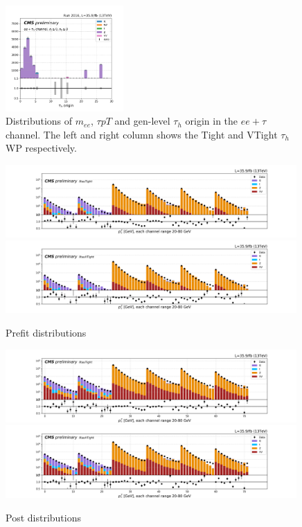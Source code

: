 \begin{figure}
    \includegraphics[width=0.4\textwidth]{appendices/jetToTauhReweighting/figures/eetau_tauGenFlavor_pickles_lltauVTight.png}
    \caption{Distributions of $m_{ee}$, $\tau pT$ and gen-level $\tau_h$ origin in the $ee+\tau$ channel. The left and right column shows the Tight and VTight $\tau_h$ WP respectively.}
    \label{fig:appendix:fakeTauId:eetau}
\end{figure}


\begin{figure}
    \centering
    \includegraphics[width=0.99\textwidth]{appendices/jetToTauhReweighting/figures/2020_tauID_prefit_lltauTight.png}
    \includegraphics[width=0.99\textwidth]{appendices/jetToTauhReweighting/figures/2020_tauID_prefit_lltauVTight.png}
    \caption{Prefit distributions}
    \label{fig:appendix:fakeTauId:prefit}
\end{figure}

\begin{figure}
    \centering
    \includegraphics[width=0.99\textwidth]{appendices/jetToTauhReweighting/figures/2020_tauID_postfit_lltauTight.png}
    \includegraphics[width=0.99\textwidth]{appendices/jetToTauhReweighting/figures/2020_tauID_postfit_lltauVTight.png}
    \caption{Post distributions}
    \label{fig:appendix:fakeTauId:postfit}
\end{figure}


